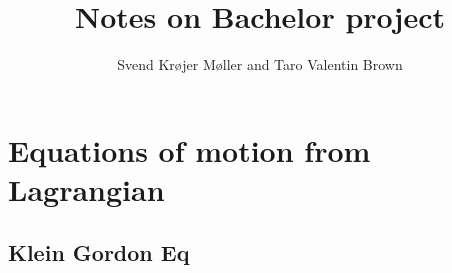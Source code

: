 \documentclass[a4,10pt,titlepage]{article}
\begin{document}
	\title{\textbf{Notes on Bachelor project}}
	\author{Svend Krøjer Møller and Taro Valentin Brown}
	\maketitle
	\tableofcontents
	\newpage
	\section{Equations of motion from Lagrangian}
	\subsection{Klein Gordon Eq}
\end{document}
